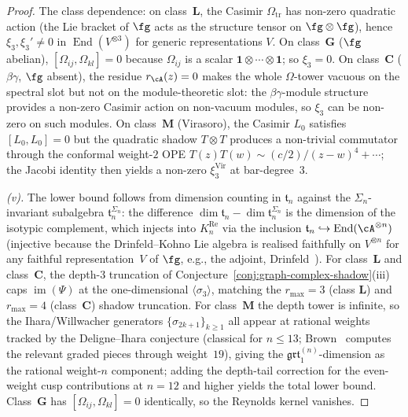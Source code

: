 \begin{proof}
The class dependence: on class~$\mathbf{L}$, the Casimir
$\Omega_{\mathrm{tr}}$ has non-zero quadratic action (the Lie
bracket of $\fg$ acts as the structure tensor on $\fg\otimes\fg$),
hence $\xi_3,\xi_3'\neq 0$ in
$\operatorname{End}(V^{\otimes 3})$ for generic representations $V$.
On class~$\mathbf{G}$ ($\fg$ abelian), $[\Omega_{ij},\Omega_{kl}]=0$
because $\Omega_{ij}$ is a scalar
$\mathbf{1}\otimes\cdots\otimes\mathbf{1}$; so $\xi_3=0$. On
class~$\mathbf{C}$ ($\beta\gamma$, $\fg$ absent), the residue
$r_\cA(z)=0$ makes the whole $\Omega$-tower vacuous on the spectral
slot but not on the module-theoretic slot: the $\beta\gamma$-module
structure provides a non-zero Casimir action on
non-vacuum modules, so $\xi_3$ can be non-zero on such modules.
On class~$\mathbf{M}$ (Virasoro), the Casimir $L_0$ satisfies
$[L_0,L_0]=0$ but the quadratic shadow $T\otimes T$ produces a
non-trivial commutator through the conformal weight-$2$ OPE
$T(z)T(w)\sim (c/2)/(z-w)^4+\cdots$; the Jacobi identity then
yields a non-zero $\xi_3^{\mathrm{Vir}}$ at bar-degree~$3$.

\emph{(v).} The lower bound follows from dimension counting in
$\mathfrak{t}_n$ against the $\Sigma_n$-invariant subalgebra
$\mathfrak{t}_n^{\Sigma_n}$: the difference
$\dim\mathfrak{t}_n-\dim\mathfrak{t}_n^{\Sigma_n}$ is the dimension
of the isotypic complement, which injects into
\(K^{\mathrm{Re}}_n\) via the inclusion
$\mathfrak{t}_n\hookrightarrow\operatorname{End}(\cA^{\otimes n})$
(injective because the Drinfeld--Kohno Lie algebra is realised
faithfully on $V^{\otimes n}$ for any faithful representation~$V$
of $\fg$, e.g., the adjoint, Drinfeld~\cite{Drinfeld90}). For
class~$\mathbf{L}$ and class~$\mathbf{C}$, the depth-$3$ truncation
of Conjecture~\ref{conj:graph-complex-shadow}(iii) caps
$\operatorname{im}(\Psi)$ at the one-dimensional $\langle\sigma_3\rangle$,
matching the $r_{\max}=3$ (class $\mathbf{L}$) and $r_{\max}=4$
(class~$\mathbf{C}$) shadow truncation. For class~$\mathbf{M}$ the
depth tower is infinite, so the Ihara/Willwacher generators
$\{\sigma_{2k+1}\}_{k\geq 1}$ all appear at rational weights
tracked by the Deligne--Ihara conjecture
(classical for $n\leq 13$; Brown~\cite{Brown12} computes the relevant
graded pieces through weight~$19$), giving the
$\mathfrak{grt}_1^{(n)}$-dimension as the rational weight-$n$
component; adding the depth-tail correction for the even-weight
cusp contributions at $n=12$ and higher yields the total
lower bound. Class~$\mathbf{G}$ has $[\Omega_{ij},\Omega_{kl}]=0$
identically, so the Reynolds kernel vanishes.


\end{proof}
